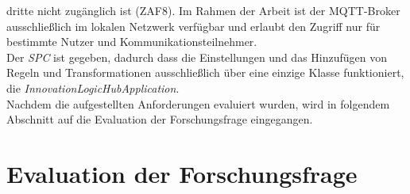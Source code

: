         dritte nicht zugänglich ist (ZAF8). Im Rahmen der Arbeit ist der \acs{MQTT}-Broker ausschließlich im lokalen Netzwerk verfügbar und erlaubt den Zugriff nur für bestimmte Nutzer und Kommunikationsteilnehmer. 
        \\
        \linebreak
        Der \textit{\acl{SPC}} ist gegeben, dadurch dass die Einstellungen und das Hinzufügen von Regeln und Transformationen ausschließlich über eine einzige Klasse funktioniert, die \textit{InnovationLogicHubApplication}. 
        \\
        \linebreak
        Nachdem die aufgestellten Anforderungen evaluiert wurden, wird in folgendem Abschnitt auf die Evaluation der Forschungsfrage eingegangen.
        \pagebreak

\section{Evaluation der Forschungsfrage}
    